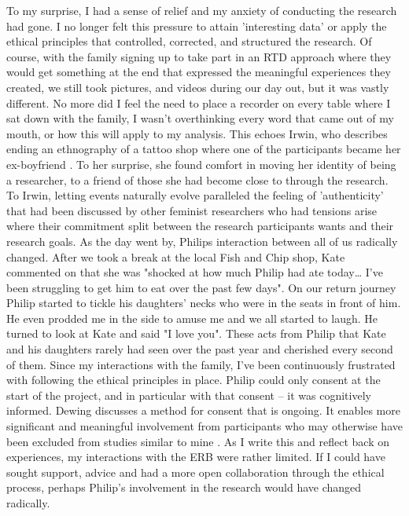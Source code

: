 To my surprise, I had a sense of relief and my anxiety of conducting the research had gone. I no longer felt this pressure to attain 'interesting data' or apply the ethical principles that controlled, corrected, and structured the research. Of course, with the family signing up to take part in an RTD approach where they would get something at the end that expressed the meaningful experiences they created, we still took pictures, and videos during our day out, but it was vastly different. No more did I feel the need to place a recorder on every table where I sat down with the family, I wasn't overthinking every word that came out of my mouth, or how this will apply to my analysis. This echoes Irwin, who describes ending an ethnography of a tattoo shop where one of the participants became her ex-boyfriend \citep{irwin_into_2006}. To her surprise, she found comfort in moving her identity of being a researcher, to a friend of those she had become close to through the research. To Irwin, letting events naturally evolve paralleled the feeling of 'authenticity' that had been discussed by other feminist researchers who had tensions arise where their commitment split between the research participants wants and their research goals. As the day went by, Philips interaction between all of us radically changed. After we took a break at the local Fish and Chip shop, Kate commented on that she was "shocked at how much Philip had ate today… I've been struggling to get him to eat over the past few days". On our return journey Philip started to tickle his daughters' necks who were in the seats in front of him. He even prodded me in the side to amuse me and we all started to laugh. He turned to look at Kate and said "I love you". These acts from Philip that Kate and his daughters rarely had seen over the past year and cherished every second of them. Since my interactions with the family, I've been continuously frustrated with following the ethical principles in place. Philip could only consent at the start of the project, and in particular with that consent – it was cognitively informed. Dewing discusses a method for consent that is ongoing. It enables more significant and meaningful involvement from participants who may otherwise have been excluded from studies similar to mine \citep{dewing_participatory_2007}. As I write this and reflect back on experiences, my interactions with the ERB were rather limited. If I could have sought support, advice and had a more open collaboration through the ethical process, perhaps Philip's involvement in the research would have changed radically.

